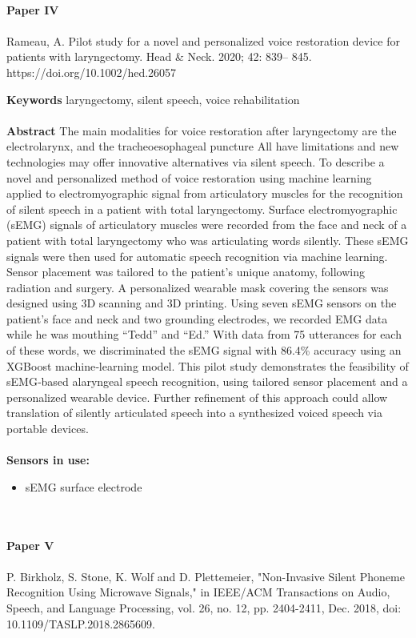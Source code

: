 \\ 
\textbf{Paper IV} 
\\ \\
\noindent
Rameau, A. Pilot study for a novel and personalized voice restoration device for patients with laryngectomy. Head & Neck. 2020; 42: 839– 845. https://doi.org/10.1002/hed.26057

\noindent
\textbf{Keywords} laryngectomy, silent speech, voice rehabilitation
\\ \\

\noindent
\textbf{Abstract} The main modalities for voice restoration after laryngectomy are the electrolarynx, and the tracheoesophageal puncture  All have limitations and new technologies may offer innovative alternatives via silent speech. To describe a novel and personalized method of voice restoration using machine learning applied to electromyographic signal from articulatory muscles for the recognition of silent speech in a patient with total laryngectomy. Surface electromyographic (sEMG) signals of articulatory muscles were recorded from the face and neck of a patient with total laryngectomy who was articulating words silently. These sEMG signals were then used for automatic speech recognition via machine learning. Sensor placement was tailored to the patient's unique anatomy, following radiation and surgery. A personalized wearable mask covering the sensors was designed using 3D scanning and 3D printing. Using seven sEMG sensors on the patient's face and neck and two grounding electrodes, we recorded EMG data while he was mouthing “Tedd” and “Ed.” With data from 75 utterances for each of these words, we discriminated the sEMG signal with 86.4\% accuracy using an XGBoost machine‐learning model. This pilot study demonstrates the feasibility of sEMG‐based alaryngeal speech recognition, using tailored sensor placement and a personalized wearable device. Further refinement of this approach could allow translation of silently articulated speech into a synthesized voiced speech via portable devices.\\ \\

\noindent
\textbf{Sensors in use:}
\begin{itemize}
    \item sEMG surface electrode \\ \\
\end{itemize}

\\ 
\textbf{Paper V} 
\\ \\
\noindent
P. Birkholz, S. Stone, K. Wolf and D. Plettemeier, "Non-Invasive Silent Phoneme Recognition Using Microwave Signals," in IEEE/ACM Transactions on Audio, Speech, and Language Processing, vol. 26, no. 12, pp. 2404-2411, Dec. 2018, doi: 10.1109/TASLP.2018.2865609.

